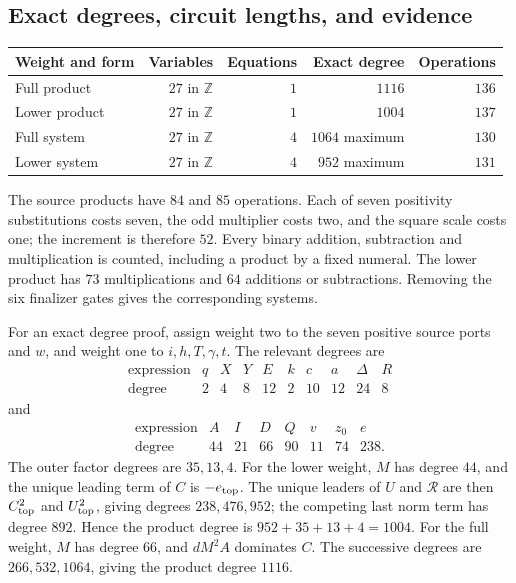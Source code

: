\subsection{Exact degrees, circuit lengths, and evidence}

\begin{center}
\begin{tabular}{lrrrr}
\hline
Weight and form & Variables & Equations & Exact degree & Operations\\
\hline
Full product & $27$ in $\mathbb Z$ & $1$ & $1116$ & $136$\\
Lower product & $27$ in $\mathbb Z$ & $1$ & $1004$ & $137$\\
Full system & $27$ in $\mathbb Z$ & $4$ & $1064$ maximum & $130$\\
Lower system & $27$ in $\mathbb Z$ & $4$ & $952$ maximum & $131$\\
\hline
\end{tabular}
\end{center}

The source products have $84$ and $85$ operations. Each of seven
positivity substitutions costs seven, the odd multiplier costs two, and
the square scale costs one; the increment is therefore $52$. Every binary
addition, subtraction and multiplication is counted, including a product
by a fixed numeral. The lower product has $73$ multiplications and
$64$ additions or subtractions. Removing the six finalizer gates gives
the corresponding systems.

For an exact degree proof, assign weight two to the seven positive source
ports and $w$, and weight one to $i,h,T,\gamma,t$. The relevant degrees are
\[
\begin{array}{c|rrrrrrrrr}
\text{expression}&q&X&Y&E&k&c&a&\Delta&R\\ \hline
\text{degree}&2&4&8&12&2&10&12&24&8
\end{array}
\]
and
\[
\begin{array}{c|rrrrrrr}
\text{expression}&A&I&D&Q&v&z_0&e\\ \hline
\text{degree}&44&21&66&90&11&74&238.
\end{array}
\]
The outer factor degrees are $35,13,4$. For the lower weight, $M$ has
degree $44$, and the unique leading term of $C$ is $-e_{\rm top}$.
The unique leaders of $U$ and $\mathcal R$ are then $C_{\rm top}^2$
and $U_{\rm top}^2$, giving degrees $238,476,952$; the competing last
norm term has degree $892$. Hence the product degree is
$952+35+13+4=1004$. For the full weight, $M$ has degree $66$, and
$dM^2A$ dominates $C$. The successive degrees are $266,532,1064$, giving
the product degree $1116$.

